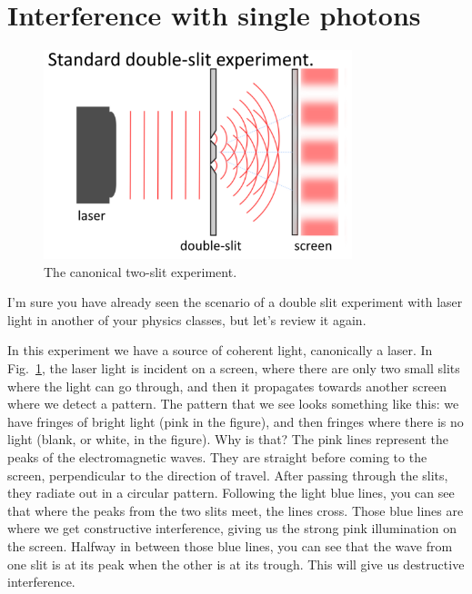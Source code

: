\section{Interference with single photons}
\label{sec:6-4_interference_single_photons}

\begin{figure}[H]
   \centering
    \includegraphics[width=0.8\textwidth]{lesson6/standard_double_slit.pdf}    
        \caption{The canonical two-slit experiment.}
    \label{fig:two-slit}
   
\end{figure}

I'm sure you have already seen the scenario of a double slit experiment with laser light in another of your physics classes, but let's review it again.

In this experiment we have a source of coherent light, canonically a laser. In Fig.~\ref{fig:two-slit}, the laser light is incident on a screen, where there are only two small slits where the light can go through, and then it propagates towards another screen where we detect a pattern. The pattern that we see looks something like this: we have fringes of bright light (pink in the figure), and then fringes where there is no light (blank, or white, in the figure). Why is that?  The pink lines represent the peaks of the electromagnetic waves. They are straight before coming to the screen, perpendicular to the direction of travel. After passing through the slits, they radiate out in a circular pattern.  Following the light blue lines, you can see that where the peaks from the two slits meet, the lines cross.  Those blue lines are where we get constructive interference, giving us the strong pink illumination on the screen. Halfway in between those blue lines, you can see that the wave from one slit is at its peak when the other is at its trough.  This will give us destructive interference.

